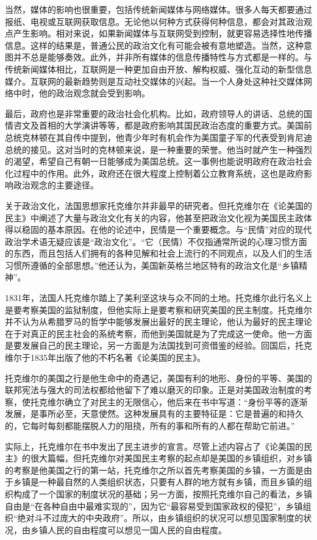 当然，媒体的影响也很重要，包括传统新闻媒体与网络媒体。很多人每天都要通过报纸、电视或互联网获取信息。无论他以何种方式获得何种信息，都会对其政治观点产生影响。相对来说，如果新闻媒体与互联网受到控制，就更容易选择性地传播信息。这样的结果是，普通公民的政治文化有可能会被有意地塑造。当然，这种意图并不总是能够奏效。此外，并非所有媒体的信息传播特性与方式都是一样的。与传统新闻媒体相比，互联网是一种更加自由开放、解构权威、强化互动的新型信息媒介。互联网的最新趋势则是互动社交媒体的兴起。当一个人身处这种社交媒体网络中时，他的政治观念就会受到影响。

最后，政府也是非常重要的政治社会化机构。比如，政府领导人的讲话、总统的国情咨文及首相的大学演讲等等，都是政府影响其国民政治态度的重要方式。美国前总统克林顿在其自传中提到，他青少年时有机会作为美国童子军的代表受到肯尼迪总统的接见。这对当时的克林顿来说，是一种重要的荣誉。他当时就产生一种强烈的渴望，希望自己有朝一日能够成为美国总统。这一事例也能说明政府在政治社会化过程中的作用。此外，政府还在很大程度上控制着公立教育系统，这也是政府影响政治观念的主要途径。


关于政治文化，法国思想家托克维尔并非最早的研究者。但托克维尔在《论美国的民主》中阐述了大量与政治文化有关的内容，他甚至把政治文化视为美国民主政体得以稳固的基本原因。在他的论述中，民情是一个重要概念。与“民情”对应的现代政治学术语无疑应该是“政治文化”。“它（民情）不仅指通常所说的心理习惯方面的东西，而且包括人们拥有的各种见解和社会上流行的不同观点，以及人们的生活习惯所遵循的全部思想。”他还认为，美国新英格兰地区特有的政治文化是“乡镇精神”。

1831年，法国人托克维尔踏上了美利坚这块与众不同的土地。托克维尔此行名义上是要考察美国的监狱制度，但他实际上是要考察和研究美国的民主制度。托克维尔并不认为从希腊罗马的哲学中能够发展出最好的民主理论，他认为最好的民主理论在于对真正的民主社会的系统考察，而他到美国就是为了完成这一使命。他一方面是要发展自己的民主理论，另一方面是为法国找到可资借鉴的经验。回国后，托克维尔于1835年出版了他的不朽名著《论美国的民主》。

托克维尔的美国之行是他生命中的奇遇记，美国有利的地形、身份的平等、美国的联邦宪法与强大的司法权都给他留下了难以磨灭的印象。正是对美国政治制度的考察，使托克维尔确立了对民主的无限信心，他后来在书中写道：“身份平等的逐渐发展，是事所必至，天意使然。这种发展具有的主要特征是：它是普遍的和持久的，它每时每刻都能摆脱人力的阻挠，所有的事和所有的人都在帮助它前进。”

实际上，托克维尔在书中发出了民主进步的宣言。尽管上述内容占了《论美国的民主》的很大篇幅，但托克维尔对美国民主考察的起点却是美国的乡镇组织，对乡镇的考察是他美国之行的第一站，托克维尔之所以首先考察美国的乡镇，一方面是由于乡镇是一种最自然的人类组织状态，只要有人群的地方就有乡镇，而且乡镇的组织构成了一个国家的制度状况的基础；另一方面，按照托克维尔自己的看法，乡镇自由是“在各种自由中最难实现的”，因为它“最容易受到国家政权的侵犯”，乡镇组织“绝对斗不过庞大的中央政府”。所以，由乡镇组织的状况可以想见国家制度的状况，由乡镇人民的自由程度可以想见一国人民的自由程度。

